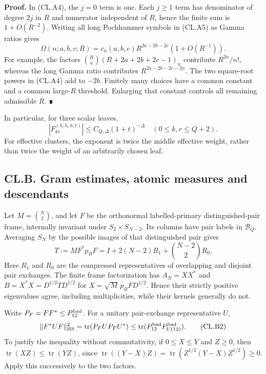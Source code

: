 \textbf{Proof.} In (CL.A4), the \(j=0\) term is one. Each \(j\geq1\) term has denominator of degree \(2j\) in \(R\) and numerator independent of \(R\), hence the finite sum is \(1+O(R^{-2})\). Writing all long Pochhammer symbols in (CL.A5) as Gamma ratios gives \[
\Omega(n;a,b,c;R)
=c_n(a,b,c)R^{2a-2b-2c}(1+O(R^{-1})).
\] For example, the factors \(\binom Rn(R+2a+2b+2c-1)_n\) contribute \(R^{2n}/n!\), whereas the long Gamma ratio contributes \(R^{2a-2b-2c-2n}\). The two square-root powers in (CL.A4) add to \(-2b\). Finitely many choices have a common constant and a common large-\(R\) threshold. Enlarging that constant controls all remaining admissible \(R\). ∎

In particular, for three scalar leaves, \[
|F_{kr}^{(h,h,h;t)}|\leq C_{Q,\Delta}(1+t)^{-\Delta}
\quad(0\leq k,r\leq Q+2).
\tag{CL.A8}
\] For effective clusters, the exponent is twice the middle effective weight, rather than twice the weight of an arbitrarily chosen leaf.

\hypertarget{cl.b.-gram-estimates-atomic-measures-and-descendants}{%
\subsection{CL.B. Gram estimates, atomic measures and descendants}\label{cl.b.-gram-estimates-atomic-measures-and-descendants}}

Let \(M=\binom N2\), and let \(F\) be the orthonormal labelled-primary distinguished-pair frame, internally invariant under \(S_2\times S_{N-2}\). Its columns have pair labels in \(\mathcal B_Q\). Averaging \(S_N\) by the possible images of that distinguished pair gives \[
T:=MF^*p_BF=I+2(N-2)R_1+\binom{N-2}{2}R_0.
\tag{CL.B1}
\] Here \(R_1\) and \(R_0\) are the compressed representatives of overlapping and disjoint pair exchanges. The finite frame factorization has \(A_N=XX^*\) and \(B=X^*X=D^{1/2}TD^{1/2}\) for \(X=\sqrt M\,p_BFD^{1/2}\). Hence their strictly positive eigenvalues agree, including multiplicities, while their kernels generally do not.

Write \(P_F=FF^*\leq P_{12}^{\rm bad}\). For a unitary pair-exchange representative \(U\), \[
\|F^*UF\|_{\rm HS}^2
=\operatorname{tr}(P_FUP_FU^*)
\leq\operatorname{tr}(P_{12}^{\rm bad}P_{U(12)}^{\rm bad}).
\tag{CL.B2}
\] To justify the inequality without commutativity, if \(0\leq X\leq Y\) and \(Z\geq0\), then \(\operatorname{tr}(XZ)\leq\operatorname{tr}(YZ)\), since \(\operatorname{tr}((Y-X)Z)=\operatorname{tr}(Z^{1/2}(Y-X)Z^{1/2})\geq0\). Apply this successively to the two factors.

